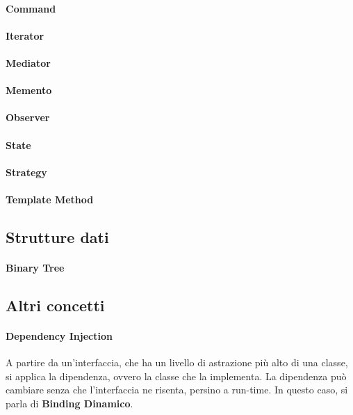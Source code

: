 \documentclass{article}
\begin{document}
            \paragraph{Command}
            \paragraph{Iterator}
            \paragraph{Mediator}
            \paragraph{Memento}
            \paragraph{Observer}
            \paragraph{State}
            \paragraph{Strategy}
            \paragraph{Template Method}
                
    \subsection{Strutture dati}
        \paragraph{Binary Tree}
    \subsection{Altri concetti}
        \paragraph{Dependency Injection} A partire da un'interfaccia, che ha un livello di astrazione più alto di una classe, si applica la dipendenza, ovvero la classe che la implementa. La dipendenza può cambiare senza che l'interfaccia ne risenta, persino a run-time. In questo caso, si parla di \textbf{Binding Dinamico}.
\end{document}
